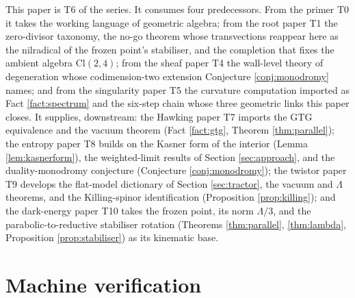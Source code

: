 \documentclass[11pt]{article}
\theoremstyle{definition}
\newcommand{\Cl}{\mathrm{Cl}}
\begin{document}
This paper is T6 of the series. It consumes four predecessors. From the primer T0 \cite{ButlerT0} it takes the working language of geometric algebra; from the root paper T1 \cite{ButlerT1} the zero-divisor taxonomy, the no-go theorem whose transvections reappear here as the nilradical of the frozen point's stabiliser, and the completion that fixes the ambient algebra $\Cl(2,4)$; from the sheaf paper T4 \cite{ButlerT4} the wall-level theory of degeneration whose codimension-two extension Conjecture \ref{conj:monodromy} names; and from the singularity paper T5 \cite{ButlerT5} the curvature computation imported as Fact \ref{fact:spectrum} and the six-step chain whose three geometric links this paper closes. It supplies, downstream: the Hawking paper T7 \cite{ButlerT7} imports the GTG equivalence and the vacuum theorem (Fact \ref{fact:gtg}, Theorem \ref{thm:parallel}); the entropy paper T8 \cite{ButlerT8} builds on the Kasner form of the interior (Lemma \ref{lem:kasnerform}), the weighted-limit results of Section \ref{sec:approach}, and the duality-monodromy conjecture (Conjecture \ref{conj:monodromy}); the twistor paper T9 \cite{ButlerT9} develops the flat-model dictionary of Section \ref{sec:tractor}, the vacuum and $\Lambda$ theorems, and the Killing-spinor identification (Proposition \ref{prop:killing}); and the dark-energy paper T10 \cite{ButlerT10} takes the frozen point, its norm $\Lambda/3$, and the parabolic-to-reductive stabiliser rotation (Theorems \ref{thm:parallel}, \ref{thm:lambda}, Proposition \ref{prop:stabiliser}) as its kinematic base.

\section{Machine verification}\label{sec:verification}
\end{document}
